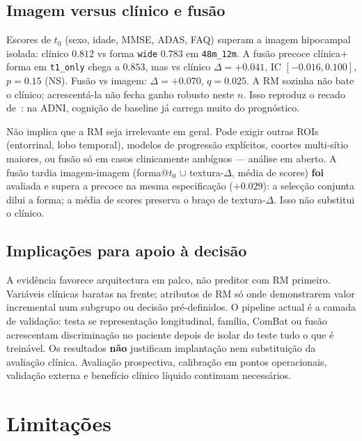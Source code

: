 \documentclass[review]{elsarticle}
\newcommand{\code}[1]{\texttt{#1}}
\begin{document}
\subsection{Imagem versus clínico e fusão}

Escores de $t_0$ (sexo, idade, MMSE, ADAS, FAQ) superam a imagem hipocampal isolada: clínico $0.812$ vs forma \code{wide} $0.783$ em \code{48m\_12m}.
A fusão precoce clínica$+$forma em \code{t1\_only} chega a $0.853$, mas vs clínico $\Delta=+0.041$, IC $[-0.016,0.100]$, $p=0.15$ (NS).
Fusão vs imagem: $\Delta=+0.070$, $q=0.025$.
A RM sozinha não bate o clínico; acrescentá-la não fecha ganho robusto neste $n$.
Isso reproduz o recado de~\citet{grassi-2019,moradi-2015}: na ADNI, cognição de baseline já carrega muito do prognóstico.

Não implica que a RM seja irrelevante em geral.
Pode exigir outras ROIs (entorrinal, lobo temporal), modelos de progressão explícitos, coortes multi-sítio maiores, ou fusão só em casos clinicamente ambíguos --- análise em aberto.
A fusão tardia imagem-imagem (forma@$t_0$ $\cup$ textura-$\Delta$, média de scores) \textbf{foi} avaliada e supera a precoce na mesma especificação ($+0.029$): a selecção conjunta dilui a forma; a média de scores preserva o braço de textura-$\Delta$.
Isso não substitui o clínico.

\subsection{Implicações para apoio à decisão}

A evidência favorece arquitectura em palco, não preditor com RM primeiro.
Variáveis clínicas baratas na frente; atributos de RM só onde demonstrarem valor incremental num subgrupo ou decisão pré-definidos.
O pipeline actual é a camada de validação: testa se representação longitudinal, família, ComBat ou fusão acrescentam discriminação no paciente depois de isolar do teste tudo o que é treinável.
Os resultados \textbf{não} justificam implantação nem substituição da avaliação clínica.
Avaliação prospectiva, calibração em pontos operacionais, validação externa e benefício clínico líquido continuam necessários.

\section{Limitações}
\label{sec:limitacao}
\end{document}
